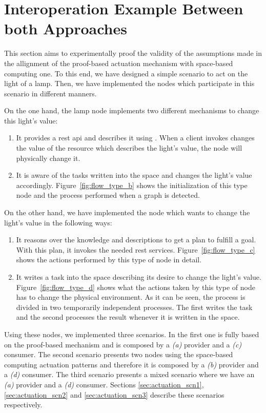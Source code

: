\section{Interoperation Example Between both Approaches}

This section aims to experimentally proof the validity of the assumptions made in the allignment of the proof-based actuation mechanism with space-based computing one.
To this end, we have designed a simple scenario to act on the light of a lamp.
Then, we have implemented the nodes which participate in this scenario in different manners.


On the one hand, the lamp node implements two different mechanisms to change this light's value:
\begin{enumerate}[label=\itshape(\alph*\upshape)]
  \item It provides a \ac{rest} \ac{api} and describes it using \restdesc{}. %
        When a client invokes changes the value of the resource which describes the light's value, the node will physically change it.
  \item It is aware of the tasks written into the space and changes the light's value accordingly. %
	Figure~\ref{fig:flow_type_b} shows the initialization of this type node and the process performed when a graph is detected.
\end{enumerate}


On the other hand, we have implemented the node which wants to change the light's value in the following ways:
\begin{enumerate}[resume,label=\itshape(\alph*\upshape)]
  \item It reasons over the knowledge and descriptions to get a plan to fulfill a goal.
	With this plan, it invokes the needed \ac{rest} services.
	Figure~\ref{fig:flow_type_c} shows the actions performed by this type of node in detail.
  \item It writes a task into the space describing its desire to change the light's value.
	Figure~\ref{fig:flow_type_d} shows what the actions taken by this type of node has to change the physical environment.
	As it can be seen, the process is divided in two temporarily independent processes.
	The first writes the task and the second processes the result whenever it is written in the space.
\end{enumerate}


Using these nodes, we implemented three scenarios.
In the first one is fully based on the proof-based mechanism and is composed by a \emph{(a)} provider and a \emph{(c)} consumer.
The second scenario presents two nodes using the space-based computing actuation patterns and therefore it is composed by a \emph{(b)} provider and a \emph{(d)} consumer.
The third scenario presents a mixed scenario where we have an \emph{(a)} provider and a \emph{(d)} consumer.
Sections \ref{sec:actuation_scn1}, \ref{sec:actuation_scn2} and \ref{sec:actuation_scn3} describe these scenarios respectively.


